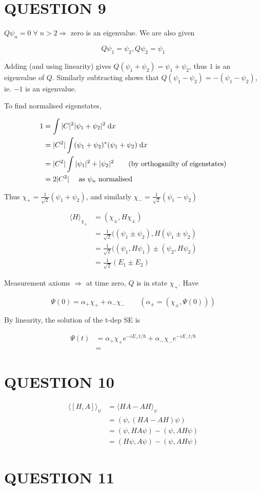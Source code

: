\documentclass[a4paper]{article}
\begin{document}
\section{QUESTION 9}


$ Q \psi_{n} = 0 \; \forall \;  n > 2 \Rightarrow  $ zero is an eigenvalue. We are also given

\[ Q \psi_{1} = \psi_{2}, Q \psi_{2} = \psi_{1} \]

Adding (and using linearity) gives $ Q(\psi_{1} + \psi_{2})  = \psi_{1} + \psi_{2} $, thus $ 1 $ is an eigenvalue of $ Q $. Similarly subtracting shows that $ Q (\psi_{1} - \psi_{2}) = - (\psi_{1} - \psi_{2}) $, ie. $ -1 $ is an eigenvalue. 

To find normalised eigenstates, 

\begin{align*}
1 & = \int | C |^{2} | \psi_{1} + \psi_{2} |^{2} \; \mathrm{d} x  \\
& = | C^{2} | \int  (\psi_{1} + \psi_{2})^{*} ( \psi_{1} + \psi_{2}) \; \mathrm{d} x\\
& = |  C^{2} | \int | \psi_{1} |^{2} + | \psi_{2} |^{2} \qquad ( \text{by orthoganilty of eigenstates})\\
& = 2 | C^{2} | \quad \text{ as } \psi_{n} \text{ normalised}
\end{align*}

Thus $ \chi_{+} = \frac{1}{\sqrt{2}} (\psi_{1} + \psi_{2})  $, and similarly $ \chi_{-} = \frac{1}{\sqrt{2}} ( \psi_{1} - \psi_{2})  $


\begin{align*}
\langle H \rangle_{\chi_{\pm}} & = ( \chi_{\pm}, H \chi_{\pm} )  \\
& = \frac{1}{\sqrt{2}} (  (\psi_{1} \pm \psi_{2}),  H( \psi_{1} \pm \psi_{2} ) \\
& = \frac{1}{\sqrt{2}} (  (\psi_{1}, H \psi_{1}) \pm  ( \psi_{2}, H \psi_{2} ) \\
& = \frac{1}{\sqrt{2}} ( E_{1} \pm E_{2} )
\end{align*}

Measurement axioms $ \Rightarrow  $ at time zero, $ Q $ is in state $ \chi_{+} $. 
Have

\[ \Psi(0) = \alpha_{+} \chi_{+} + \alpha_{-} \chi_{-} \qquad (\alpha_{\pm} = (\chi_{\pm},\Psi(0) )) \]

By linearity, the solution of the t-dep SE is

\begin{align*}
\Psi(t) & = \alpha_{+} \chi_{+} e^{- i E_{+} t / \hbar } + \alpha_{-} \chi_{-} e^{- i E_{-} t / \hbar }  \\
& = 
\end{align*}



\section{QUESTION 10}


\begin{align*}
\langle [H,A] \rangle_{\psi} & = \langle HA - AH \rangle_{\psi}  \\
& = (  \psi, (HA - AH)\psi ) \\
& = ( \psi, HA \psi) - ( \psi, AH \psi) \\
& = ( H \psi, A \psi) - ( \psi, AH \psi)
\end{align*}

\section{QUESTION 11}
\end{document}
